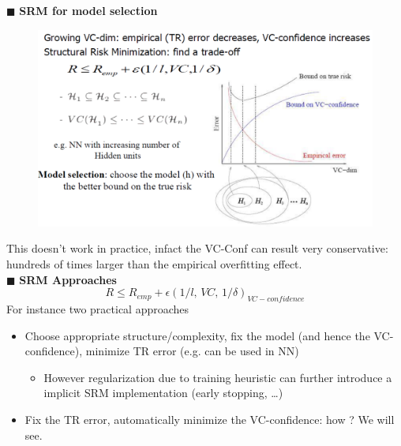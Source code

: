 \documentclass[../main.tex]{subfiles}
\begin{document}
\noindent $\blacksquare$ \textbf{SRM for model selection}
\begin{figure}[H]
    \centering
    \includegraphics[scale = 0.5]{lectures/5_validation/5_srm_model.png}
\end{figure}
\noindent This doesn't work in practice, infact the VC-Conf can result very conservative: hundreds of times larger than the empirical overfitting effect.\\

\noindent $\blacksquare$ \textbf{SRM Approaches}
$$R \leq R_{emp} + \epsilon(1/l,\,VC,\,1/\delta)_{VC-confidence}$$
For instance two practical approaches
\begin{itemize}
    \item Choose appropriate structure/complexity, fix the model (and hence the VC-confidence), minimize TR error (e.g. can be used in NN)
    \begin{itemize}
        \item However regularization due to training heuristic can further introduce a implicit SRM implementation (early stopping, …)
    \end{itemize}
    \item Fix the TR error, automatically minimize the VC-confidence: how ? We will see.
\end{itemize}
\end{document}
